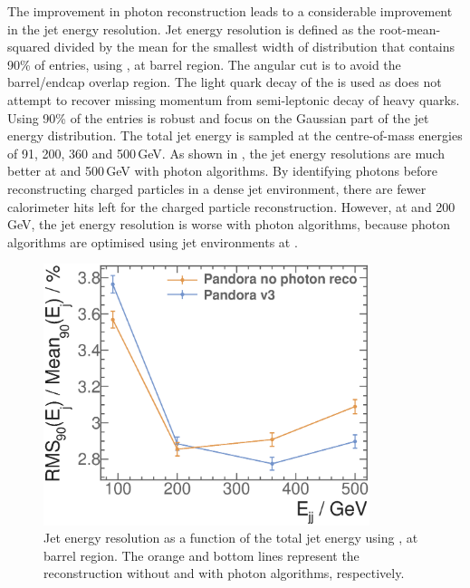 The improvement in photon reconstruction leads to a considerable improvement in the jet energy resolution. Jet energy resolution is defined as the root-mean-squared divided by the mean for the smallest width of distribution that contains 90\% of entries, using \eeZuds, at barrel region. The angular cut is to avoid the barrel/endcap overlap region. The light quark decay of the \Zprime is used as \pandora does not attempt to recover missing momentum from semi-leptonic decay of heavy quarks. Using 90\% of the entries is robust and focus on the Gaussian part of the jet energy distribution. The total jet energy is sampled at the centre-of-mass energies of 91, 200, 360 and 500\,GeV. As shown in , the jet energy resolutions are much better at  and 500\,GeV with photon algorithms. By identifying photons before reconstructing charged particles in a dense jet environment, there are fewer calorimeter hits left for the charged particle reconstruction. However, at  and 200\,GeV, the jet energy resolution is worse with photon algorithms, because photon algorithms are optimised using jet environments at .

\begin{figure}[tbph]
\centering
\includegraphics[width=0.85\textwidth]{photon/JERmuon.eps}
\caption[Jet energy resolution as a function of the total jet energy without and with photon related algorithms]
{Jet energy resolution as a function of the  total jet energy using \eeZuds,  at barrel region. The orange and bottom lines represent the reconstruction without and with photon algorithms, respectively.}
\label{fig:photonJERmuon}
\end{figure}



